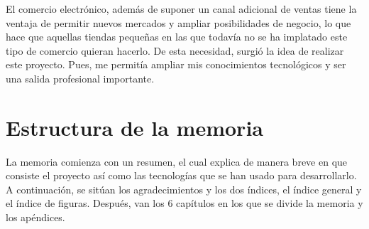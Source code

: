 \documentclass[a4paper, 12pt]{book}
\begin{document}
El comercio electrónico, además de suponer un canal adicional de ventas tiene la ventaja de permitir nuevos mercados y ampliar posibilidades de negocio, lo que hace que aquellas tiendas pequeñas en las que todavía no se ha implatado este tipo de comercio quieran hacerlo. De esta necesidad, surgió la idea de realizar este proyecto. Pues, me permitía ampliar mis conocimientos tecnológicos y ser una salida profesional importante. 

\section{Estructura de la memoria}
\label{sec:estructura}

La memoria comienza con un resumen, el cual explica de manera breve en que consiste el proyecto así como las tecnologías que se han usado para desarrollarlo. A continuación, se sitúan los agradecimientos y los dos índices, el índice general y el índice de figuras. Después, van los 6 capítulos en los que se divide la memoria y los apéndices.   
\end{document}
